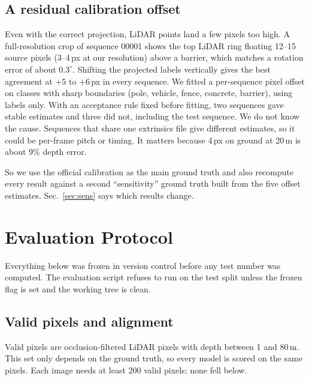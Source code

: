 \documentclass[conference]{IEEEtran}
\begin{document}
\subsection{A residual calibration offset}\label{sec:calib}
Even with the correct projection, LiDAR points land a few pixels too high. A full-resolution crop of sequence 00001 shows the top LiDAR ring floating 12--15 source pixels (3--4\,px at our resolution) above a barrier, which matches a rotation error of about $0.3^\circ$. Shifting the projected labels vertically gives the best agreement at $+5$ to $+6$\,px in every sequence. We fitted a per-sequence pixel offset on classes with sharp boundaries (pole, vehicle, fence, concrete, barrier), using labels only. With an acceptance rule fixed before fitting, two sequences gave stable estimates and three did not, including the test sequence. We do not know the cause. Sequences that share one extrinsics file give different estimates, so it could be per-frame pitch or timing. It matters because 4\,px on ground at 20\,m is about 9\% depth error.

So we use the official calibration as the main ground truth and also recompute every result against a second ``sensitivity'' ground truth built from the five offset estimates. Sec.~\ref{sec:sens} says which results change.

\section{Evaluation Protocol}\label{sec:protocol}
Everything below was frozen in version control before any test number was computed. The evaluation script refuses to run on the test split unless the frozen flag is set and the working tree is clean.

\subsection{Valid pixels and alignment}
Valid pixels are occlusion-filtered LiDAR pixels with depth between 1 and 80\,m. This set only depends on the ground truth, so every model is scored on the same pixels. Each image needs at least 200 valid pixels; none fell below.
\end{document}
